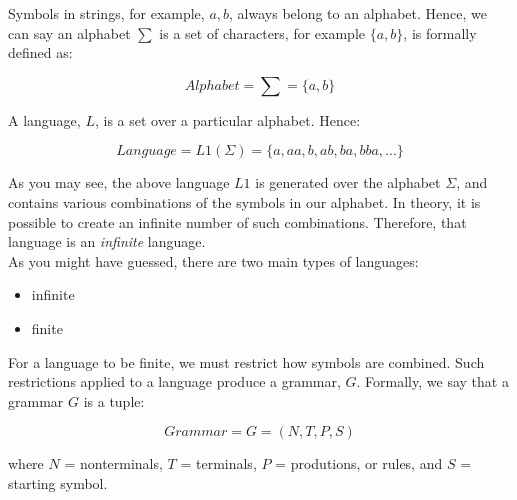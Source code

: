 \documentclass[../../main.tex]{subfiles}
\begin{document}
Symbols in strings, for example, \( a, b \), always belong to an alphabet.
Hence, we can say an alphabet \(\sum\) is a set of characters, for example \(\{a, b\}\), is formally defined as:

\begin{equation} \label{alphabet}
Alphabet = \sum = \big\{ a, b \big\} 
\end{equation}

A language, \( L \), is a set over a particular alphabet. Hence:

\begin{equation} \label{language}
    Language = L1(\Sigma) = \big\{ a, aa, b, ab, ba, bba, ... \big\} 
\end{equation}

As you may see, the above language \( L1 \) is generated over the alphabet \( \Sigma \), and contains various combinations of the symbols in our alphabet. In theory,
it is possible to create an infinite number of such combinations. Therefore, that language is an \textit{infinite} language. \\

As you might have guessed, there are two main types of languages:

\begin{itemize}
\item infinite
\item finite
\end{itemize}

For a language to be finite, we must restrict how symbols are combined. Such restrictions applied to a language produce a grammar, \( G \).
Formally, we say that a grammar \( G \) is a tuple:

\begin{equation} \label{grammar}
    Grammar = G = ( N, T, P, S )
\end{equation}

where \(N\) = nonterminals, \(T\) = terminals, \(P\) = produtions, or rules, and \(S\) = starting symbol.
\end{document}
